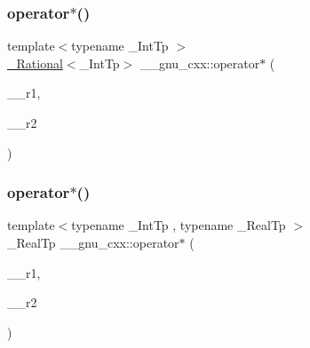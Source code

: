 \subsubsection{\texorpdfstring{operator$\ast$()}{operator*()}\hspace{0.1cm}{\footnotesize\ttfamily [1/3]}}
{\footnotesize\ttfamily template$<$typename \+\_\+\+Int\+Tp $>$ \\
\hyperlink{class____gnu__cxx_1_1__Rational}{\+\_\+\+Rational}$<$\+\_\+\+Int\+Tp$>$ \+\_\+\+\_\+gnu\+\_\+cxx\+::operator$\ast$ (\begin{DoxyParamCaption}\item[{const \hyperlink{class____gnu__cxx_1_1__Rational}{\+\_\+\+Rational}$<$ \+\_\+\+Int\+Tp $>$ \&}]{\+\_\+\+\_\+r1,  }\item[{const \hyperlink{class____gnu__cxx_1_1__Rational}{\+\_\+\+Rational}$<$ \+\_\+\+Int\+Tp $>$ \&}]{\+\_\+\+\_\+r2 }\end{DoxyParamCaption})}

\mbox{\label{namespace____gnu__cxx_abefdb068557b930d6cb4a8457d24a163}} 
\subsubsection{\texorpdfstring{operator$\ast$()}{operator*()}\hspace{0.1cm}{\footnotesize\ttfamily [2/3]}}
{\footnotesize\ttfamily template$<$typename \+\_\+\+Int\+Tp , typename \+\_\+\+Real\+Tp $>$ \\
\+\_\+\+Real\+Tp \+\_\+\+\_\+gnu\+\_\+cxx\+::operator$\ast$ (\begin{DoxyParamCaption}\item[{\+\_\+\+Real\+Tp}]{\+\_\+\+\_\+r1,  }\item[{const \hyperlink{class____gnu__cxx_1_1__Rational}{\+\_\+\+Rational}$<$ \+\_\+\+Int\+Tp $>$ \&}]{\+\_\+\+\_\+r2 }\end{DoxyParamCaption})}

\mbox{\label{namespace____gnu__cxx_a1db4d29ae3d034851c4b09a20273eb0b}} 
